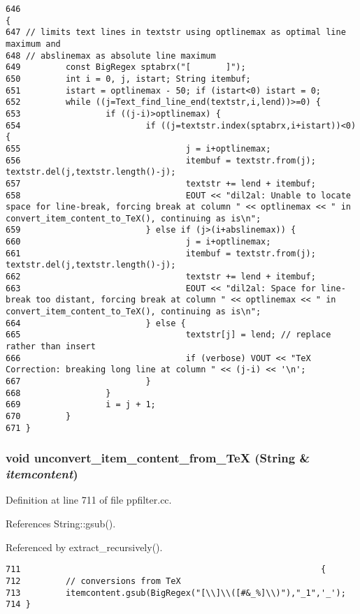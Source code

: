 \footnotesize\begin{verbatim}646                                                                                                 {
647 // limits text lines in textstr using optlinemax as optimal line maximum and
648 // abslinemax as absolute line maximum
649         const BigRegex sptabrx("[       ]");
650         int i = 0, j, istart; String itembuf;
651         istart = optlinemax - 50; if (istart<0) istart = 0;
652         while ((j=Text_find_line_end(textstr,i,lend))>=0) {
653                 if ((j-i)>optlinemax) {
654                         if ((j=textstr.index(sptabrx,i+istart))<0) {
655                                 j = i+optlinemax;
656                                 itembuf = textstr.from(j); textstr.del(j,textstr.length()-j);
657                                 textstr += lend + itembuf;
658                                 EOUT << "dil2al: Unable to locate space for line-break, forcing break at column " << optlinemax << " in convert_item_content_to_TeX(), continuing as is\n";
659                         } else if (j>(i+abslinemax)) {
660                                 j = i+optlinemax;
661                                 itembuf = textstr.from(j); textstr.del(j,textstr.length()-j);
662                                 textstr += lend + itembuf;
663                                 EOUT << "dil2al: Space for line-break too distant, forcing break at column " << optlinemax << " in convert_item_content_to_TeX(), continuing as is\n";
664                         } else {
665                                 textstr[j] = lend; // replace rather than insert
666                                 if (verbose) VOUT << "TeX Correction: breaking long line at column " << (j-i) << '\n';
667                         }
668                 }
669                 i = j + 1;
670         }
671 }
\end{verbatim}\normalsize 
{}
\subsubsection{\setlength{\rightskip}{0pt plus 5cm}void unconvert\_\-item\_\-content\_\-from\_\-Te\-X ({\bf String} \& {\em itemcontent})}\label{ppfilter_8cc_a18}




Definition at line 711 of file ppfilter.cc.

References String::gsub().

Referenced by extract\_\-recursively().



\footnotesize\begin{verbatim}711                                                            {
712         // conversions from TeX
713         itemcontent.gsub(BigRegex("[\\]\\([#&_%]\\)"),"_1",'_');
714 }
\end{verbatim}\normalsize 

